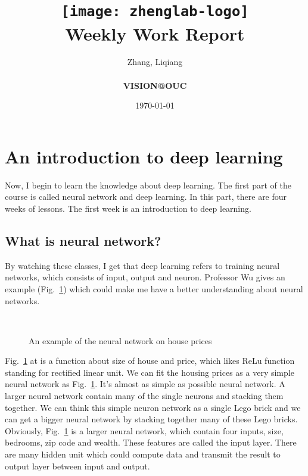 \documentclass[a4paper]{article}
\title{
    \vspace*{1in}
    \texttt{[image: zhenglab-logo]} \\
    \vspace*{1.2in}
    \textbf{\huge Weekly Work Report}
    \vspace{0.2in}
}
\author{Zhang, Liqiang \\
    \vspace*{0.5in} \\
    \textbf{VISION@OUC} \\
    \vspace*{1in}
}
\date{\today}
\begin{document}
\maketitle
\setcounter{page}{0}
\thispagestyle{empty}
\newpage
\section{An introduction to deep learning}
\par
Now, I begin to learn the knowledge about deep learning. The first part of the course is called neural network and deep learning. In this part, there are four weeks of lessons. The first week is an introduction to deep learning. 
\subsection{What is neural network?}
By watching these classes, I get that deep learning refers to training neural networks, which consists of input, output and neuron. Professor Wu gives an example (Fig.~\ref{1}) which could make me have a better understanding about neural networks.
\begin{figure}[!htb]
    \centering
    \quad
    \\
    \caption{An example of the neural network on house prices}
    \label{1}
\end{figure}
\par
Fig.~\ref{1} at\cite{note} is a function about size of house and price, which likes ReLu function standing for rectified linear unit. We can fit the housing prices as a very simple neural network as Fig.~\ref{1}. It's almost as simple as possible neural network. A larger neural network contain many of the single neurons and stacking them together. We can think this simple neuron network as a single Lego brick and we can get a bigger neural network by stacking together many of these Lego bricks. Obviously, Fig.~\ref{1} is a larger neural network, which contain four inputs, size, bedrooms, zip code and wealth. These features are called the input layer. There are many hidden unit which could compute data and transmit the result to output layer between input and output. 
\par
\end{document}
